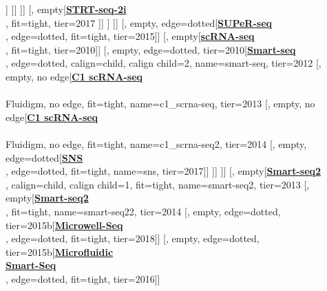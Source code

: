 \documentclass[12pt, a4]{article}
\begin{document}
\begin{center}
\begin{forest}
						[, empty[\href{https://www.nature.com/articles/s41467-018-05347-6}{\textbf{mcSCRB-seq}}\\\citealt{bagnoli2018}, fit=tight, tier=2018]]
					]]
				]]
				[, empty[\href{https://www.nature.com/articles/s41598-017-16546-4}{\textbf{STRT-seq-2i}}\\\citealt{hochgerner2017}, fit=tight, tier=2017
				]]
			]
		]]
		[, empty, edge=dotted[\href{https://genomebiology.biomedcentral.com/articles/10.1186/s13059-015-0706-1}{\textbf{SUPeR-seq}}\\\citealt{fan2015}, edge=dotted, fit=tight, tier=2015]]
		[, empty[\href{https://www.nature.com/articles/nprot.2009.236}{\textbf{scRNA-seq}}\\\citealt{tang2010}, fit=tight, tier=2010]]
		[, empty, edge=dotted, tier=2010[\href{https://www.nature.com/articles/nbt.2282}{\textbf{Smart-seq}}\\\citealt{ramskold2012}, edge=dotted, calign=child, calign child=2, name=smart-seq, tier=2012
			[, empty, no edge[\href{https://www.nature.com/articles/nmeth.2694}{\textbf{C1 scRNA-seq}}\\\citealt{wu2013}\\Fluidigm, no edge, fit=tight, name=c1_scrna-seq, tier=2013
				[, empty, no edge[\href{https://www.nature.com/articles/nbt.2967}{\textbf{C1 scRNA-seq}}\\\citealt{pollen2014}\\Fluidigm, no edge, fit=tight, name=c1_scrna-seq2, tier=2014
					[, empty, edge=dotted[\href{https://www.nature.com/articles/s41598-017-04426-w}{\textbf{SNS}}\\\citealt{lake2017b}, edge=dotted, fit=tight, name=sns, tier=2017]]
					]]
			]]
			[, empty[\href{https://www.nature.com/articles/nmeth.2639}{\textbf{Smart-seq2}}\\\citealt{picelli2013}, calign=child, calign child=1, fit=tight, name=smart-seq2, tier=2013
				[, empty[\href{https://www.nature.com/articles/nprot.2014.006}{\textbf{Smart-seq2}}\\\citealt{picelli2014}, fit=tight, name=smart-seq22, tier=2014
						[, empty, edge=dotted, tier=2015b[\href{https://www.cell.com/cell/fulltext/S0092-8674(18)30116-8}{\textbf{Microwell-Seq}}\\\citealt{han2018}, edge=dotted, fit=tight, tier=2018]]
						[, empty, edge=dotted, tier=2015b[\href{https://www.nature.com/articles/ncomms10220}{\textbf{Microfluidic}}\\\href{https://www.nature.com/articles/ncomms10220}{\textbf{Smart-Seq}}\\\citealt{kimmerling2016}, edge=dotted, fit=tight, tier=2016]]

\end{forest}
\end{center}
\end{document}
